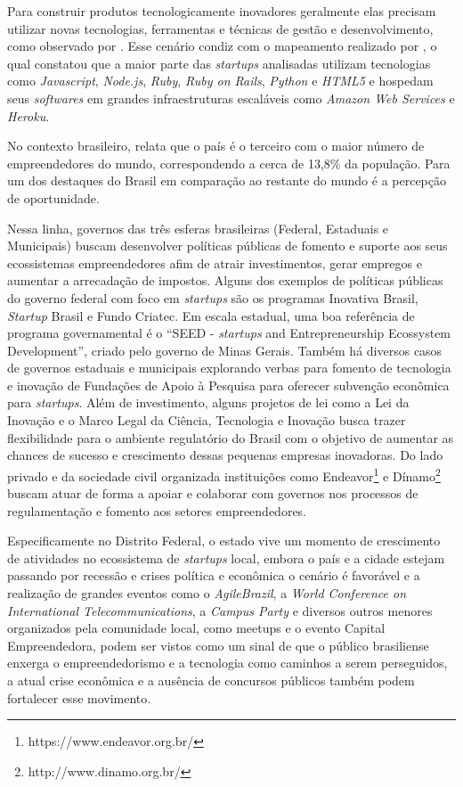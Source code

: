 Para construir produtos tecnologicamente inovadores geralmente elas precisam utilizar novas tecnologias, ferramentas e técnicas de gestão e desenvolvimento, como observado por . Esse cenário condiz com o mapeamento realizado por , o qual constatou que a maior parte das \textit{startups} analisadas utilizam tecnologias como \textit{Javascript}, \textit{Node.js}, \textit{Ruby}, \textit{Ruby on Rails}, \textit{Python} e \textit{HTML5} e hospedam seus \textit{softwares} em grandes infraestruturas escaláveis como \textit{Amazon Web Services} e \textit{Heroku}. 

No contexto brasileiro,  relata que o país é o terceiro com o maior número de empreendedores do mundo, correspondendo a cerca de 13,8\% da população. Para  um dos destaques do Brasil em comparação ao restante do mundo é a percepção de oportunidade.

Nessa linha, governos das três esferas brasileiras (Federal, Estaduais e Municipais) buscam desenvolver políticas públicas de fomento e suporte aos seus ecossistemas empreendedores afim de atrair investimentos, gerar empregos e aumentar a arrecadação de impostos. Alguns dos exemplos de políticas públicas do governo federal com foco em \textit{startups} são os programas Inovativa Brasil, \textit{Startup} Brasil e Fundo Criatec. Em escala estadual, uma boa referência de programa governamental é o ``SEED - \textit{startups} and Entrepreneurship Ecossystem Development'', criado pelo governo de Minas Gerais. Também há diversos casos de governos estaduais e municipais explorando verbas para fomento de tecnologia e inovação de Fundações de Apoio à Pesquisa para oferecer subvenção econômica para \textit{startups}. Além de investimento, alguns projetos de lei como a Lei da Inovação e o Marco Legal da Ciência, Tecnologia e Inovação busca trazer flexibilidade para o ambiente regulatório do Brasil com o objetivo de aumentar as chances de sucesso e crescimento dessas pequenas empresas inovadoras. Do lado privado e da sociedade civil organizada instituições como Endeavor\footnote{https://www.endeavor.org.br/} e Dínamo\footnote{http://www.dinamo.org.br/} buscam atuar de forma a apoiar e colaborar com governos nos processos de regulamentação e fomento aos setores empreendedores.

Especificamente no Distrito Federal, o estado vive um momento de crescimento de atividades no ecossistema de \textit{startups} local, embora o país e a cidade estejam passando por recessão e crises política e econômica o cenário é favorável e a realização de grandes eventos como o \textit{AgileBrazil}, a \textit{World Conference on International Telecommunications}, a \textit{Campus Party} e diversos outros menores organizados pela comunidade local, como meetups e o evento Capital Empreendedora, podem ser vistos como um sinal de que o público brasiliense enxerga o empreendedorismo e a tecnologia como caminhos a serem perseguidos, a atual crise econômica e a ausência de concursos públicos também podem fortalecer esse movimento.

